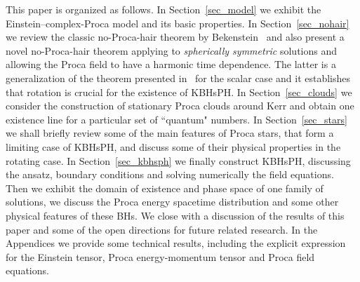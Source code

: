 \bigskip

This paper is organized as follows. In Section~\ref{sec_model} we exhibit the Einstein--complex-Proca model and its basic properties. In Section~\ref{sec_nohair} we review the classic no-Proca-hair theorem by Bekenstein~\cite{Bekenstein:1971hc,Bekenstein:1972ky} and also present a novel no-Proca-hair theorem applying to \textit{spherically symmetric} solutions and allowing the Proca field to have a harmonic time dependence. The latter is a generalization of the theorem presented in~\cite{Pena:1997cy} for the scalar case and it establishes that rotation is crucial for the existence of KBHsPH. In Section~\ref{sec_clouds} we consider the construction of stationary Proca clouds around Kerr and obtain one existence line for a particular set of ``quantum" numbers. In Section~\ref{sec_stars} we shall briefly review some of the main features of Proca stars, that form a limiting case of KBHsPH, and discuss some of their physical properties in the rotating case. In Section~\ref{sec_kbhsph} we finally construct KBHsPH, discussing the ansatz, boundary conditions and solving numerically the field equations. Then we exhibit the domain of existence and phase space of one family of solutions, we discuss the Proca energy spacetime distribution and some other physical features of these BHs. We close with a discussion of the results of this paper and some of the open directions for future related research.  In the Appendices we provide some technical results, including the explicit expression for the Einstein tensor, Proca energy-momentum tensor and Proca field equations.







